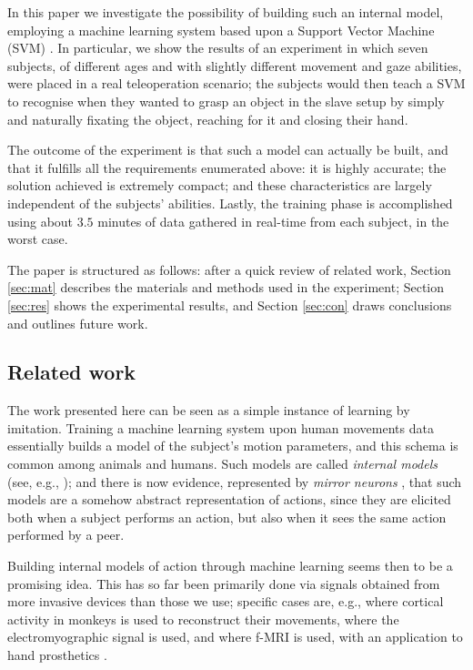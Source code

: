 \documentclass{article}
\begin{document}
In this paper we investigate the possibility of building such an
internal model, employing a machine learning system based upon a
Support Vector Machine (SVM) \cite{BGV92}. In particular, we show the
results of an experiment in which seven subjects, of different ages
and with slightly different movement and gaze abilities, were placed
in a real teleoperation scenario; the subjects would then teach a SVM
to recognise when they wanted to grasp an object in the slave setup by
simply and naturally fixating the object, reaching for it and closing
their hand.

The outcome of the experiment is that such a model can actually be
built, and that it fulfills all the requirements enumerated above: it
is highly accurate; the solution achieved is extremely compact; and
these characteristics are largely independent of the subjects'
abilities. Lastly, the training phase is accomplished using about
$3.5$ minutes of data gathered in real-time from each subject, in the
worst case.

The paper is structured as follows: after a quick review of related
work, Section \ref{sec:mat} describes the materials and methods used
in the experiment; Section \ref{sec:res} shows the experimental
results, and Section \ref{sec:con} draws conclusions and outlines
future work.

\subsection*{Related work}

The work presented here can be seen as a simple instance of learning
by imitation. Training a machine learning system upon human movements
data essentially builds a model of the subject's motion parameters,
and this schema is common among animals and humans. Such models are
called \emph{internal models} (see, e.g.,
\cite{kawato-99,wolpert-03,mussaivaldi-00}); and there is now
evidence, represented by \emph{mirror neurons}
\cite{rizzolatti-04,gallese-96,rizzolatti-01}, that such models are a
somehow abstract representation of actions, since they are elicited
both when a subject performs an action, but also when it sees the same
action performed by a peer.

Building internal models of action through machine learning seems then
to be a promising idea. This has so far been primarily done via
signals obtained from more invasive devices than those we use; specific
cases are, e.g., \cite{black1} where cortical activity in monkeys is
used to reconstruct their movements, \cite{emg} where the
electromyographic signal is used, and \cite{yokoi} where f-MRI is
used, with an application to hand prosthetics \cite{yokoi2}.
\end{document}

